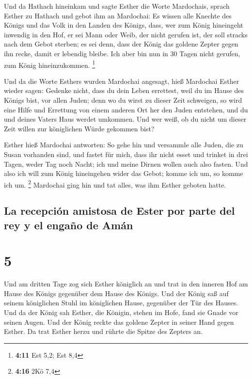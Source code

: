  Und da Hathach hineinkam und sagte Esther die Worte
Mardochais,  sprach Esther zu Hathach und gebot ihm an
Mardochai:  Es wissen alle Knechte des Königs und das
Volk in den Landen des Königs, dass, wer zum König hineingeht inwendig
in den Hof, er sei Mann oder Weib, der nicht gerufen ist, der soll
stracks nach dem Gebot sterben; es sei denn, dass der König das goldene
Zepter gegen ihn recke, damit er lebendig bleibe. Ich aber bin nun in 30
Tagen nicht gerufen, zum König hineinzukommen. \footnote{\textbf{4:11}
  Est 5,2; Est 8,4}

 Und da die Worte Esthers wurden Mardochai angesagt,
 hieß Mardochai Esther wieder sagen: Gedenke nicht, dass
du dein Leben errettest, weil du im Hause des Königs bist, vor allen
Juden;  denn wo du wirst zu dieser Zeit schweigen, so
wird eine Hilfe und Errettung von einem anderen Ort her den Juden
entstehen, und du und deines Vaters Haus werdet umkommen. Und wer weiß,
ob du nicht um dieser Zeit willen zur königlichen Würde gekommen bist?

 Esther hieß Mardochai antworten:  So gehe
hin und versammle alle Juden, die zu Susan vorhanden sind, und fastet
für mich, dass ihr nicht esset und trinket in drei Tagen, weder Tag noch
Nacht; ich und meine Dirnen wollen auch also fasten. Und also ich will
zum König hineingehen wider das Gebot; komme ich um, so komme ich um.
\footnote{\textbf{4:16} 2Kö 7,4}  Mardochai ging hin und
tat alles, was ihm Esther geboten hatte.

\hypertarget{la-recepciuxf3n-amistosa-de-ester-por-parte-del-rey-y-el-engauxf1o-de-amuxe1n}{%
\subsection{La recepción amistosa de Ester por parte del rey y el engaño
de
Amán}\label{la-recepciuxf3n-amistosa-de-ester-por-parte-del-rey-y-el-engauxf1o-de-amuxe1n}}

\hypertarget{section-4}{%
\section{5}\label{section-4}}

 Und am dritten Tage zog sich Esther königlich an und trat
in den inneren Hof am Hause des Königs gegenüber dem Hause des Königs.
Und der König saß auf seinem königlichen Stuhl im königlichen Hause,
gegenüber der Tür des Hauses.  Und da der König sah
Esther, die Königin, stehen im Hofe, fand sie Gnade vor seinen Augen.
Und der König reckte das goldene Zepter in seiner Hand gegen Esther. Da
trat Esther herzu und rührte die Spitze des Zepters an.

